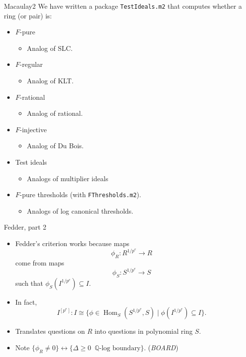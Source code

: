 \documentclass[xcolor=dvipsnames]{beamer}
\newcommand{\memph}[1]{{\color{Red}\emph{#1}}}
\DeclareMathOperator{\Hom}{Hom}
\theoremstyle{remark}
\begin{document}
\begin{frame}[c]{Macaulay2}
  We have written a package {\tt TestIdeals.m2} that computes whether a ring (or pair) is:
  \begin{itemize}
    \item<2->  $F$-pure
    \begin{itemize}
      \item<3->  Analog of SLC.
    \end{itemize}
    \item<4->  $F$-regular
    \begin{itemize}
      \item<5->  Analog of KLT.
    \end{itemize}
    \item<6->  $F$-rational
    \begin{itemize}
      \item<7->  Analog of rational.
    \end{itemize}
    \item<7->  $F$-injective
    \begin{itemize}
      \item<8->  Analog of Du Bois.
    \end{itemize}
    \item<8->  Test ideals
    \begin{itemize}
      \item<9->  Analogs of multiplier ideals
    \end{itemize}
    \item<10->  $F$-pure thresholds (with {\tt FThresholds.m2}).
    \begin{itemize}
      \item<11->  Analogs of log canonical thresholds.
    \end{itemize}
    
  \end{itemize}
\end{frame}


\begin{frame}[c]{Fedder, part 2}
  \begin{itemize}
  \item<1->Fedder's criterion works because maps
  \[
  \phi_R : R^{1/p^e} \to R
  \]
  come from maps
  \[
  \phi_S : S^{1/p^e} \to S
  \]
  such that $\phi_S(I^{1/p^e}) \subseteq I$.
\item<2->  In fact,
\[
I^{[p^e]} : I \cong \{ \phi \in \Hom_S(S^{1/p^e}, S) \;|\; \phi(I^{1/p^e}) \subseteq I \}.
\]
\item<3->  Translates questions on $R$ into questions in polynomial ring $S$.
\item<4->  Note $\{\phi_R \neq 0\} \leftrightarrow \{\Delta\geq 0\;\; \text{$\mathbb{Q}$-log boundary} \}$.  (\memph{BOARD})
\end{itemize}
\end{frame}
\end{document}
